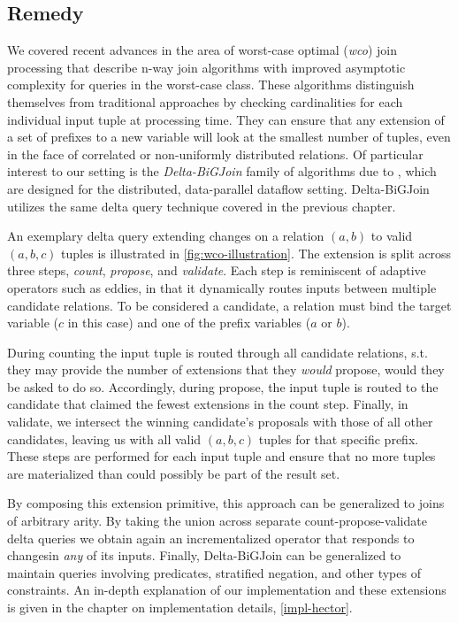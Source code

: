\documentclass[../catalog.tex]{subfiles}
\begin{document}
\subsection{Remedy}

We covered recent advances in the area of worst-case optimal
(\emph{wco}) join processing that describe n-way join algorithms with
improved asymptotic complexity for queries in the worst-case
class. These algorithms distinguish themselves from traditional
approaches by checking cardinalities for each individual input tuple
at processing time. They can ensure that any extension of a set of
prefixes to a new variable will look at the smallest number of tuples,
even in the face of correlated or non-uniformly distributed
relations. Of particular interest to our setting is the
\emph{Delta-BiGJoin} family of algorithms due to
\cite{ammar2018distributed}, which are designed for the distributed,
data-parallel dataflow setting. Delta-BiGJoin utilizes the same delta
query technique covered in the previous chapter.

An exemplary delta query extending changes on a relation $(a,b)$ to
valid $(a,b,c)$ tuples is illustrated in
\autoref{fig:wco-illustration}. The extension is split across three
steps, \emph{count}, \emph{propose}, and \emph{validate}. Each step is
reminiscent of adaptive operators such as eddies, in that it
dynamically routes inputs between multiple candidate relations. To be
considered a candidate, a relation must bind the target variable ($c$
in this case) and one of the prefix variables ($a$ or $b$).

During counting the input tuple is routed through all candidate
relations, s.t. they may provide the number of extensions that they
\emph{would} propose, would they be asked to do so. Accordingly,
during propose, the input tuple is routed to the candidate that
claimed the fewest extensions in the count step. Finally, in validate,
we intersect the winning candidate's proposals with those of all other
candidates, leaving us with all valid $(a,b,c)$ tuples for that
specific prefix. These steps are performed for each input tuple and
ensure that no more tuples are materialized than could possibly be
part of the result set.

By composing this extension primitive, this approach can be
generalized to joins of arbitrary arity. By taking the union across
separate count-propose-validate delta queries we obtain again an
incrementalized operator that responds to changesin \emph{any} of its
inputs. Finally, Delta-BiGJoin can be generalized to maintain queries
involving predicates, stratified negation, and other types of
constraints. An in-depth explanation of our implementation and these
extensions is given in the chapter on implementation details,
\autoref{impl-hector}.
\end{document}

